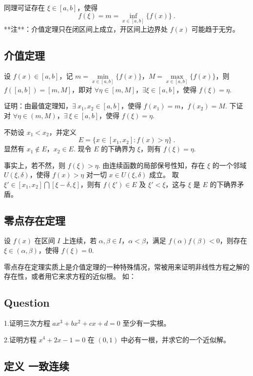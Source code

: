   同理可证存在 $\xi\in[a,b]$，使得
$$
  f(\xi)=m=\inf\limits_{x\in[a,b]}\{f(x)\}~.
$$
  **注**：介值定理只在闭区间上成立，开区间上边界处 $f(x)$ 可能趋于无穷。

\subsection{介值定理}\label{sub_conff_4}

  设 $f(x)\in [a,b]$，记 $m=\min\limits_{x\in[a,b]}\{f(x)\}$，$M=\max\limits_{x\in[a,b]}\{f(x)\}$，则 $f([a,b])=[m,M]$，即对 $\forall \eta\in[m,M]$，$\exists \xi\in[a,b]$，使得 $f(\xi)=\eta$.

  证明：由最值定理知，$\exists\ x_1,x_2\in[a,b]$，使得 $f(x_1)=m$，$f(x_2)=M$. 下证对 $\forall \eta\in (m,M)$，$\exists\  \xi\in[a,b]$，使得 $f(\xi)=\eta$.

  不妨设 $x_1<x_2$，并定义
  $$
  E=\{x\in[x_1,x_2]:f(x)>\eta\}~.
  $$
  显然有 $x_1\notin E$，$x_2\in E$. 现令 $E$ 的下确界为 $\xi$，则有 $f(\xi)=\eta$.

  事实上，若不然，则 $f(\xi)>\eta$. 由连续函数的局部保号性知，存在 $\xi$ 的一个邻域 $U(\xi,\delta)$，使得 $f(x)>\eta$ 对一切 $x\in U(\xi,\delta)$ 成立。 取 $\xi'\in[x_1,x_2]\bigcap [\xi-\delta,\xi]$，则有 $f(\xi')\in E$ 及 $\xi'<\xi$，这与 $\xi$ 是 $E$ 的下确界矛盾。

\subsection{零点存在定理}

  设 $f(x)$ 在区间 $I$ 上连续，若 $\alpha,\beta\in I$，$\alpha<\beta$，满足 $f(\alpha)f(\beta)<0$，则存在 $\xi\in(\alpha,\beta)$，使得 $f(\xi)=0$.

  零点存在定理实质上是介值定理的一种特殊情况，常被用来证明非线性方程之解的存在性，或者用它来求方程的近似根。 如：

\subsection{Question}

  1.证明三次方程 $ax^3+bx^2+cx+d=0$ 至少有一实根。

  2.证明方程 $x^4+2x-1=0$ 在 $(0,1)$ 中必有一根，并求它的一个近似解。

\subsection{定义  一致连续}\label{sub_conff_2}

